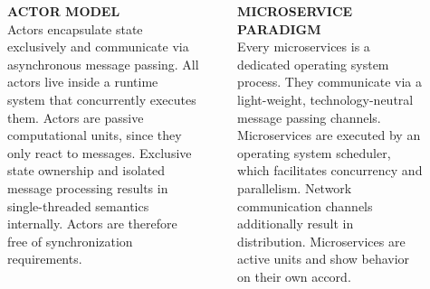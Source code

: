 \documentclass[final,hyperref={pdfpagelabels=true}]{beamer}
\begin{document}
\begin{frame}
\begin{columns}[t]
\begin{column}{.46\textwidth}
{        }
      \end{column}
      \begin{column}{.02\textwidth}
      \end{column}
  \end{columns}

  \vspace*{2\baselineskip}

  \begin{columns}[t]
    \begin{column}{.02\textwidth}
    \end{column}
    \begin{column}{.46\textwidth}
      \textsf{\textbf{ACTOR MODEL}} \\
      \vspace*{\baselineskip}
      {\lmodern
        Actors encapsulate state exclusively and communicate via asynchronous message passing. All actors live inside a runtime system that concurrently executes them. Actors are passive computational units, since they only react to messages. Exclusive state ownership and isolated message processing results in single-threaded semantics internally. Actors are therefore free of synchronization requirements.
      }
    \end{column}
    \begin{column}{.04\textwidth}
    \end{column}
    \begin{column}{.46\textwidth}
      \textsf{\textbf{MICROSERVICE PARADIGM}} \\
      \vspace*{\baselineskip}
      {\lmodern
        Every microservices is a dedicated operating system process. They communicate via a light-weight, technology-neutral message passing channels. Microservices are executed by an operating system scheduler, which facilitates concurrency and parallelism. Network communication channels additionally result in distribution. Microservices are active units and show behavior on their own accord.
      }
    \end{column}
    \begin{column}{.02\textwidth}
    \end{column}
  \end{columns}

  \vspace*{2\baselineskip}
  

\end{frame}
\end{document}
